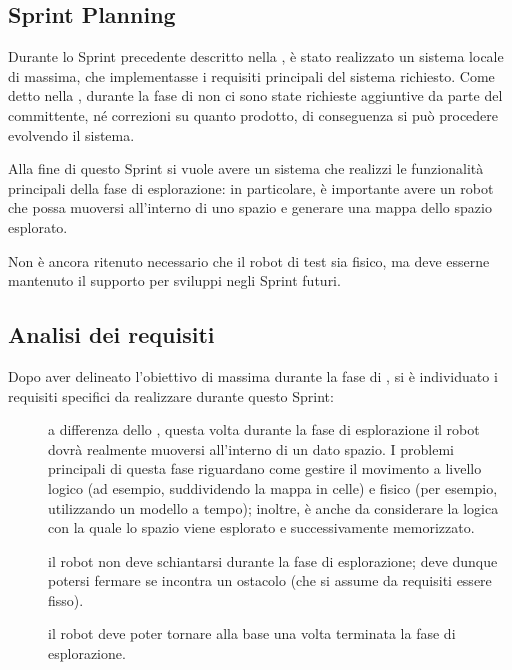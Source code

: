 

\subsection{Sprint Planning}

Durante lo Sprint precedente descritto nella , è stato realizzato un sistema locale di massima, che implementasse i requisiti principali del sistema richiesto.
Come detto nella , durante la fase di  non ci sono state richieste aggiuntive da parte del committente, né correzioni su quanto prodotto, di conseguenza si può procedere evolvendo il sistema.

Alla fine di questo Sprint si vuole avere un sistema che realizzi le funzionalità principali della fase di esplorazione:
in particolare, è importante avere un robot che possa muoversi all'interno di uno spazio e generare una mappa dello spazio esplorato.

Non è ancora ritenuto necessario che il robot di test sia fisico, ma deve esserne mantenuto il supporto per sviluppi negli Sprint futuri.

\subsection{Analisi dei requisiti}

Dopo aver delineato l'obiettivo di massima durante la fase di , si è individuato i requisiti specifici da realizzare durante questo Sprint:

\begin{description}
  \item[]
    a differenza dello , questa volta durante la fase di esplorazione il robot dovrà realmente muoversi all'interno di un dato spazio.
    I problemi principali di questa fase riguardano come gestire il movimento a livello logico (ad esempio, suddividendo la mappa in celle) e fisico (per esempio, utilizzando un modello a tempo);
    inoltre, è anche da considerare la logica con la quale lo spazio viene esplorato e successivamente memorizzato.

  \item[]
    il robot non deve schiantarsi durante la fase di esplorazione;
    deve dunque potersi fermare se incontra un ostacolo (che si assume da requisiti essere fisso).

  \item[]
    il robot deve poter tornare alla base una volta terminata la fase di esplorazione.
\end{description}

